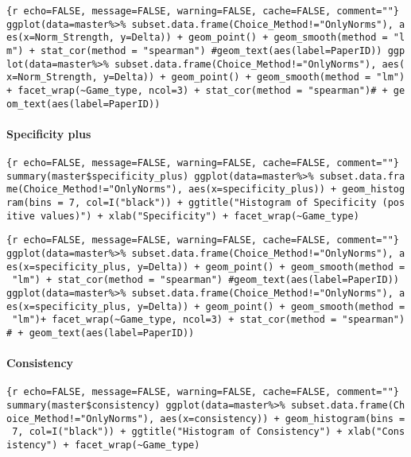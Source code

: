 \texttt{\{r\ echo=FALSE,\ message=FALSE,\ warning=FALSE,\ cache=FALSE,\ comment=""\}\ ggplot(data=master\%\textgreater{}\%\ subset.data.frame(Choice\_Method!="OnlyNorms"),\ aes(x=Norm\_Strength,\ y=Delta))\ +\ geom\_point()\ +\ geom\_smooth(method\ =\ "lm")\ +\ stat\_cor(method\ =\ "spearman")\ \#geom\_text(aes(label=PaperID))\ ggplot(data=master\%\textgreater{}\%\ subset.data.frame(Choice\_Method!="OnlyNorms"),\ aes(x=Norm\_Strength,\ y=Delta))\ +\ geom\_point()\ +\ geom\_smooth(method\ =\ "lm")+\ facet\_wrap(\textasciitilde{}Game\_type,\ ncol=3)\ +\ stat\_cor(method\ =\ "spearman")\#\ +\ geom\_text(aes(label=PaperID))}

\hypertarget{specificity-plus}{%
\paragraph{Specificity plus}\label{specificity-plus}}

\texttt{\{r\ echo=FALSE,\ message=FALSE,\ warning=FALSE,\ cache=FALSE,\ comment=""\}\ summary(master\$specificity\_plus)\ ggplot(data=master\%\textgreater{}\%\ subset.data.frame(Choice\_Method!="OnlyNorms"),\ aes(x=specificity\_plus))\ +\ geom\_histogram(bins\ =\ 7,\ col=I("black"))\ +\ ggtitle("Histogram\ of\ Specificity\ (positive\ values)")\ +\ xlab("Specificity")\ +\ facet\_wrap(\textasciitilde{}Game\_type)}

\texttt{\{r\ echo=FALSE,\ message=FALSE,\ warning=FALSE,\ cache=FALSE,\ comment=""\}\ ggplot(data=master\%\textgreater{}\%\ subset.data.frame(Choice\_Method!="OnlyNorms"),\ aes(x=specificity\_plus,\ y=Delta))\ +\ geom\_point()\ +\ geom\_smooth(method\ =\ "lm")\ +\ stat\_cor(method\ =\ "spearman")\ \#geom\_text(aes(label=PaperID))\ ggplot(data=master\%\textgreater{}\%\ subset.data.frame(Choice\_Method!="OnlyNorms"),\ aes(x=specificity\_plus,\ y=Delta))\ +\ geom\_point()\ +\ geom\_smooth(method\ =\ "lm")+\ facet\_wrap(\textasciitilde{}Game\_type,\ ncol=3)\ +\ stat\_cor(method\ =\ "spearman")\#\ +\ geom\_text(aes(label=PaperID))}

\hypertarget{consistency}{%
\paragraph{Consistency}\label{consistency}}

\texttt{\{r\ echo=FALSE,\ message=FALSE,\ warning=FALSE,\ cache=FALSE,\ comment=""\}\ summary(master\$consistency)\ ggplot(data=master\%\textgreater{}\%\ subset.data.frame(Choice\_Method!="OnlyNorms"),\ aes(x=consistency))\ +\ geom\_histogram(bins\ =\ 7,\ col=I("black"))\ +\ ggtitle("Histogram\ of\ Consistency")\ +\ xlab("Consistency")\ +\ facet\_wrap(\textasciitilde{}Game\_type)}

